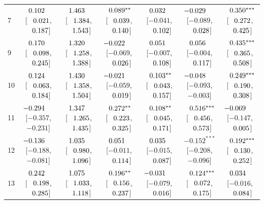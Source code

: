 \begin{table}[htbp]
{\begin{tabular}{lcccccc}
7 & $\hphantom{-}0.102^{\hphantom{***}}$ [$\hphantom{-}0.021$, $\hphantom{-}0.187$] & $\hphantom{-}1.463^{\hphantom{***}}$ [$\hphantom{-}1.384$, $\hphantom{-}1.543$] & $\hphantom{-}0.089^{**\hphantom{*}}$ [$\hphantom{-}0.039$, $\hphantom{-}0.140$] & $\hphantom{-}0.032^{\hphantom{***}}$ [$-0.041$, $\hphantom{-}0.102$] & $-0.029^{\hphantom{***}}$ [$-0.089$, $\hphantom{-}0.028$] & $\hphantom{-}0.350^{***}$ [$\hphantom{-}0.272$, $\hphantom{-}0.425$] \\
9 & $\hphantom{-}0.170^{\hphantom{***}}$ [$\hphantom{-}0.098$, $\hphantom{-}0.245$] & $\hphantom{-}1.320^{\hphantom{***}}$ [$\hphantom{-}1.258$, $\hphantom{-}1.388$] & $-0.022^{\hphantom{***}}$ [$-0.069$, $\hphantom{-}0.026$] & $\hphantom{-}0.051^{\hphantom{***}}$ [$-0.007$, $\hphantom{-}0.108$] & $\hphantom{-}0.056^{\hphantom{***}}$ [$-0.004$, $\hphantom{-}0.117$] & $\hphantom{-}0.435^{***}$ [$\hphantom{-}0.365$, $\hphantom{-}0.508$] \\
10 & $\hphantom{-}0.124^{\hphantom{***}}$ [$\hphantom{-}0.063$, $\hphantom{-}0.184$] & $\hphantom{-}1.430^{\hphantom{***}}$ [$\hphantom{-}1.358$, $\hphantom{-}1.504$] & $-0.021^{\hphantom{***}}$ [$-0.059$, $\hphantom{-}0.019$] & $\hphantom{-}0.103^{**\hphantom{*}}$ [$\hphantom{-}0.043$, $\hphantom{-}0.157$] & $-0.048^{\hphantom{***}}$ [$-0.093$, $-0.003$] & $\hphantom{-}0.249^{***}$ [$\hphantom{-}0.190$, $\hphantom{-}0.308$] \\
11 & $-0.294^{\hphantom{***}}$ [$-0.357$, $-0.231$] & $\hphantom{-}1.347^{\hphantom{***}}$ [$\hphantom{-}1.265$, $\hphantom{-}1.435$] & $\hphantom{-}0.272^{**\hphantom{*}}$ [$\hphantom{-}0.223$, $\hphantom{-}0.325$] & $\hphantom{-}0.108^{**\hphantom{*}}$ [$\hphantom{-}0.045$, $\hphantom{-}0.171$] & $\hphantom{-}0.516^{***}$ [$\hphantom{-}0.456$, $\hphantom{-}0.573$] & $-0.069^{\hphantom{***}}$ [$-0.147$, $\hphantom{-}0.005$] \\
12 & $-0.136^{\hphantom{***}}$ [$-0.188$, $-0.081$] & $\hphantom{-}1.035^{\hphantom{***}}$ [$\hphantom{-}0.980$, $\hphantom{-}1.096$] & $\hphantom{-}0.051^{\hphantom{***}}$ [$-0.011$, $\hphantom{-}0.114$] & $\hphantom{-}0.035^{\hphantom{***}}$ [$-0.015$, $\hphantom{-}0.087$] & $-0.152^{***}$ [$-0.208$, $-0.096$] & $\hphantom{-}0.192^{***}$ [$\hphantom{-}0.130$, $\hphantom{-}0.252$] \\
13 & $\hphantom{-}0.242^{\hphantom{***}}$ [$\hphantom{-}0.198$, $\hphantom{-}0.285$] & $\hphantom{-}1.075^{\hphantom{***}}$ [$\hphantom{-}1.033$, $\hphantom{-}1.118$] & $\hphantom{-}0.196^{**\hphantom{*}}$ [$\hphantom{-}0.156$, $\hphantom{-}0.237$] & $-0.031^{\hphantom{***}}$ [$-0.079$, $\hphantom{-}0.016$] & $\hphantom{-}0.124^{***}$ [$\hphantom{-}0.072$, $\hphantom{-}0.175$] & $\hphantom{-}0.034^{\hphantom{***}}$ [$-0.016$, $\hphantom{-}0.084$] \\

\end{tabular}}
\end{table}
